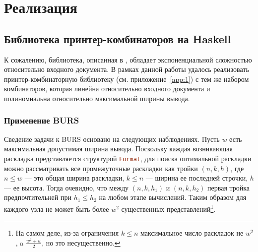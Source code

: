 \section{Реализация}

\subsection{Библиотека принтер-комбинаторов на Haskell}
К сожалению, библиотека, описанная в \cite{swierstra}, обладает экспоненциальной
сложностью относительно входного документа. В рамках данной работы удалось реализовать
принтер-комбинаторную библиотеку (см. приложение~\ref{app:1}) с тем же набором комбинаторов,
которая линейна относительно входного документа и полиномиальна
относительно максимальной ширины вывода.


\subsubsection{Применение BURS}
Сведение задачи к BURS основано на следующих наблюдениях. Пусть $w$ есть максимальная допустимая
ширина вывода. Поскольку каждая возникающая раскладка представляется структурой
\lstinline[language=Haskell]{Format}, для поиска оптимальной раскладки можно рассматривать
все промежуточные раскладки
как тройки $(n, k, h)$, где $n \le w$ --- это общая ширина раскладки, $k \le n$ ---
ширина ее последней строчки, $h$ --- ее высота. Тогда очевидно, что между $(n, k, h_1)$ и
$(n, k, h_2)$ первая тройка предпочтительней при $h_1 \le h_2$ на любом этапе вычислений.
Таким образом для каждого узла не может быть более $w^2$ существенных представлений\footnote{
На самом деле, из-за ограничения $k \le n$ максимальное число раскладок не $w^2$, a
$\frac{w^2 + w}{2}$, но это несущественно.}.

